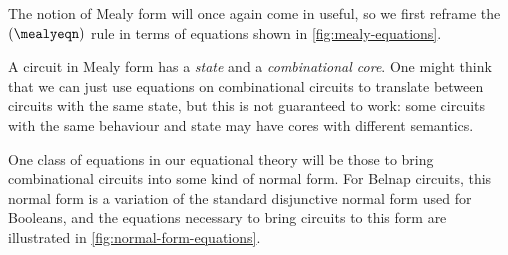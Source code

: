 \documentclass[10pt]{article}
\begin{document}
The notion of Mealy form will once again come in useful, so we first reframe the
\((\mealyeqn)\) rule in terms of equations shown in \cref{fig:mealy-equations}.

A circuit in Mealy form has a \emph{state} and a \emph{combinational core}.
One might think that we can just use equations on combinational circuits to
translate between circuits with the same state, but this is not guaranteed to
work: some circuits with the same behaviour and state may have cores with
different semantics.


One class of equations in our equational theory will be
those to bring combinational circuits into some kind of normal form.
For Belnap circuits, this normal form is a variation of the standard disjunctive
normal form used for Booleans, and the equations necessary to bring circuits to
this form are illustrated in \cref{fig:normal-form-equations}.
\end{document}
